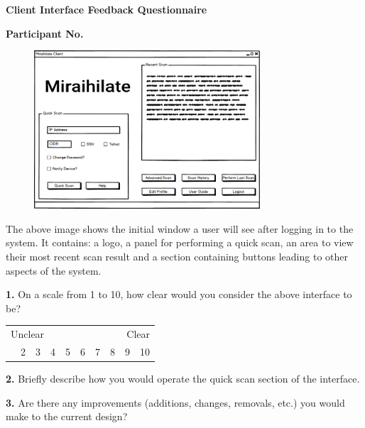 \begin{center}
	\textbf{Client Interface Feedback Questionnaire}\par
	\textbf{Participant No.}\par
\end{center}

\vspace{0.5cm}

\begin{figure}[h]
\begin{center}
	\includegraphics[width=0.75\textwidth]{img/client_iface_mockup.png}
\end{center}
\end{figure}

\vspace{0.5cm}

The above image shows the initial window a user will see after logging in to the system. It contains: a logo, a panel for performing a quick scan,
an area to view their most recent scan result and a section containing buttons leading to other aspects of the system.

\vspace{0.5cm}

\textbf{1.} On a scale from 1 to 10, how clear would you consider the above interface to be?

\begin{center}
	\begin{table}[h]
	\label{my-label}
	\begin{tabularx}{\textwidth}{XXXXXXXXXX}
	\multicolumn{5}{l}{Unclear} & \multicolumn{5}{r}{Clear} \\
	\centering
	1    & 2    & 3    & 4    & 5    & 6   & 7   & 8   & 9  & 10
	\end{tabularx}
	\end{table}
\end{center}

\textbf{2.} Briefly describe how you would operate the quick scan section of the interface.

\vspace{5cm}

\textbf{3.} Are there any improvements (additions, changes, removals, etc.) you would make to the current design?

\vspace{5cm}
